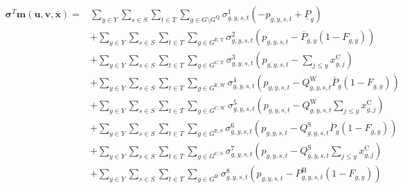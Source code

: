 \documentclass{article}
\newcommand{\sGenerators}{G}
\newcommand{\sGeneratorsExistingThermal}{G^{\mathrm{E,T}}}
\newcommand{\sGeneratorsExistingWind}{G^{\mathrm{E,W}}}
\newcommand{\sGeneratorsExistingSolar}{G^{\mathrm{E,S}}}
\newcommand{\sGeneratorsCandidateThermal}{G^{\mathrm{C,T}}}
\newcommand{\sGeneratorsCandidateWind}{G^{\mathrm{C,W}}}
\newcommand{\sGeneratorsCandidateSolar}{G^{\mathrm{C,S}}}
\newcommand{\sGeneratorsHydro}{G^{\mathrm{H}}}
\newcommand{\sStorage}{G^{\mathrm{Q}}}
\newcommand{\sYears}{Y}
\newcommand{\sScenarios}{S}
\newcommand{\sIntervals}{T}
\newcommand{\iGenerator}{g}
\newcommand{\iYear}{y}
\newcommand{\iYearAlias}{j}
\newcommand{\iScenario}{s}
\newcommand{\iInterval}{t}
\newcommand{\cPowerOutputMax}[1][\iGenerator,\iYear]{\overline{P}_{#1}}
\newcommand{\cPowerOutputMin}[1][\iGenerator]{\underline{P}_{#1}}
\newcommand{\cCapacityFactorWind}[1][\iGenerator,\iYear,\iScenario,\iInterval]{Q_{#1}^{\mathrm{W}}}
\newcommand{\cCapacityFactorSolar}[1][\iGenerator,\iYear,\iScenario,\iInterval]{Q_{#1}^{\mathrm{S}}}
\newcommand{\cRetirementIndicator}[1][\iGenerator,\iYear]{F_{#1}}
\newcommand{\cPowerOutputHydro}[1][\iGenerator,\iYear,\iScenario,\iInterval]{P^{\mathrm{H}}_{#1}}
\newcommand{\vInstalledCapacity}[1][\iGenerator,\iYear]{x^{\mathrm{C}}_{#1}}
\newcommand{\vPower}[1][\iGenerator,\iYear,\iScenario,\iInterval]{p_{#1}}
\newcommand{\dMinPowerOutput}[1][\iGenerator,\iYear,\iScenario,\iInterval]{\sigma_{#1}^{1}}
\newcommand{\dMaxPowerOutputExistingThermal}[1][\iGenerator,\iYear,\iScenario,\iInterval]{\sigma_{#1}^{2}}
\newcommand{\dMaxPowerOutputCandidateThermal}[1][\iGenerator,\iYear,\iScenario,\iInterval]{\sigma_{#1}^{3}}
\newcommand{\dMaxPowerOutputWindExisting}[1][\iGenerator,\iYear,\iScenario,\iInterval]{\sigma_{#1}^{4}}
\newcommand{\dMaxPowerOutputWindCandidate}[1][\iGenerator,\iYear,\iScenario,\iInterval]{\sigma_{#1}^{5}}
\newcommand{\dMaxPowerOutputSolarExisting}[1][\iGenerator,\iYear,\iScenario,\iInterval]{\sigma_{#1}^{6}}
\newcommand{\dMaxPowerOutputSolarCandidate}[1][\iGenerator,\iYear,\iScenario,\iInterval]{\sigma_{#1}^{7}}
\newcommand{\dMaxPowerOutputHydro}[1][\iGenerator,\iYear,\iScenario,\iInterval]{\sigma_{#1}^{8}}
\begin{document}
\begin{align}
		\bm{\sigma}^{T}\bm{m}(\bm{u}, \bm{v}, \bm{\overline{x}}) = & \sum\limits_{\iYear \in \sYears}\sum\limits_{\iScenario \in \sScenarios}\sum\limits_{\iInterval \in \sIntervals} \sum\limits_{\iGenerator \in \sGenerators \setminus \sStorage} \dMinPowerOutput \left(-\vPower + \cPowerOutputMin\right)\\
		& + \sum\limits_{\iYear \in \sYears}\sum\limits_{\iScenario \in \sScenarios}\sum\limits_{\iInterval \in \sIntervals} \sum\limits_{\iGenerator \in \sGeneratorsExistingThermal} \dMaxPowerOutputExistingThermal \left(\vPower - \cPowerOutputMax \left(1 - \cRetirementIndicator\right)\right)\\
		& + \sum\limits_{\iYear \in \sYears}\sum\limits_{\iScenario \in \sScenarios}\sum\limits_{\iInterval \in \sIntervals} \sum\limits_{\iGenerator \in \sGeneratorsCandidateThermal} \dMaxPowerOutputCandidateThermal \left(\vPower - \sum\limits_{\iYearAlias \leq \iYear} \vInstalledCapacity[\iGenerator,\iYearAlias]\right)\\
		& + \sum\limits_{\iYear \in \sYears}\sum\limits_{\iScenario \in \sScenarios}\sum\limits_{\iInterval \in \sIntervals} \sum\limits_{\iGenerator \in \sGeneratorsExistingWind} \dMaxPowerOutputWindExisting \left(\vPower - \cCapacityFactorWind \cPowerOutputMax[\iGenerator] \left(1 - \cRetirementIndicator\right) \right)\\
		& + \sum\limits_{\iYear \in \sYears}\sum\limits_{\iScenario \in \sScenarios}\sum\limits_{\iInterval \in \sIntervals} \sum\limits_{\iGenerator \in \sGeneratorsCandidateWind} \dMaxPowerOutputWindCandidate \left(\vPower - \cCapacityFactorWind \sum\limits_{\iYearAlias \leq \iYear} \vInstalledCapacity[\iGenerator,\iYearAlias]\right)\\
		& + \sum\limits_{\iYear \in \sYears}\sum\limits_{\iScenario \in \sScenarios}\sum\limits_{\iInterval \in \sIntervals} \sum\limits_{\iGenerator \in \sGeneratorsExistingSolar} \dMaxPowerOutputSolarExisting \left(\vPower - \cCapacityFactorSolar \cPowerOutputMax[\iGenerator] \left(1 - \cRetirementIndicator\right)\right)\\
		& + \sum\limits_{\iYear \in \sYears}\sum\limits_{\iScenario \in \sScenarios}\sum\limits_{\iInterval \in \sIntervals} \sum\limits_{\iGenerator \in \sGeneratorsCandidateSolar} \dMaxPowerOutputSolarCandidate \left(\vPower - \cCapacityFactorSolar \sum\limits_{\iYearAlias \leq \iYear} \vInstalledCapacity[\iGenerator,\iYearAlias]\right)\\
		& + \sum\limits_{\iYear \in \sYears}\sum\limits_{\iScenario \in \sScenarios}\sum\limits_{\iInterval \in \sIntervals} \sum\limits_{\iGenerator \in \sGeneratorsHydro} \dMaxPowerOutputHydro \left(\vPower - \cPowerOutputHydro \left(1 - \cRetirementIndicator\right) \right)\\

\end{align}
\end{document}

